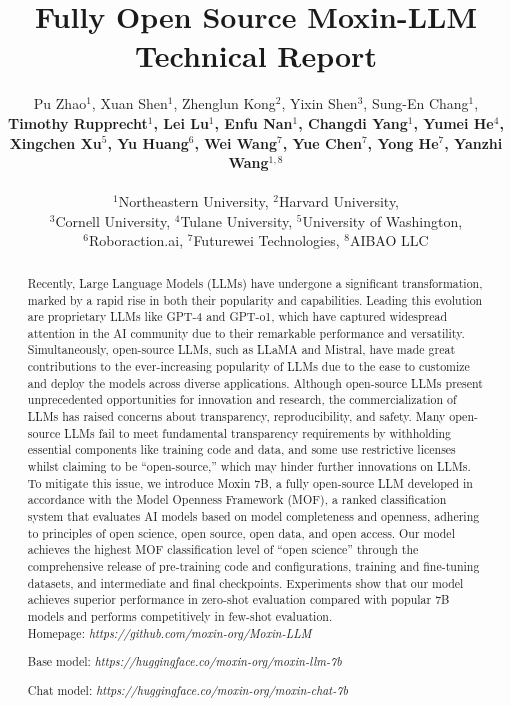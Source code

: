 \documentclass{article}
\title{Fully Open Source Moxin-LLM Technical Report}
\author{Pu Zhao$^1$, Xuan Shen$^1$, Zhenglun Kong$^2$, Yixin Shen$^{3}$, Sung-En Chang$^1$, \\ \textbf{Timothy Rupprecht$^1$,  Lei Lu$^1$, Enfu Nan$^1$, Changdi Yang$^1$, Yumei He$^4$, }\\ \textbf{Xingchen Xu$^5$, Yu Huang$^6$, Wei Wang$^7$, Yue Chen$^7$, Yong He$^7$, Yanzhi Wang$^{1,8}$} \\
\\$^1$Northeastern University, $^2$Harvard University,  \\ $^3$Cornell University,  $^4$Tulane University,
 $^5$University of Washington,  \\ $^6$Roboraction.ai, $^7$Futurewei Technologies, $^8$AIBAO LLC}
\begin{document}
\maketitle

\begin{abstract}
Recently, Large Language Models (LLMs) have undergone a significant transformation, marked by a rapid rise in both their popularity and capabilities. Leading this evolution are proprietary LLMs like GPT-4 and GPT-o1, which have captured widespread attention in the AI community due to their remarkable performance and versatility. Simultaneously, open-source LLMs, such as LLaMA and Mistral, have made great contributions to the ever-increasing popularity of LLMs due to the ease to customize and deploy the models across diverse applications. Although open-source LLMs present unprecedented opportunities for innovation and research, the commercialization of LLMs has raised concerns about transparency, reproducibility, and safety. Many open-source LLMs fail to meet fundamental transparency requirements by withholding essential components like training code and data, and some use restrictive licenses whilst claiming to be ``open-source,'' which may hinder further innovations on LLMs. To mitigate this issue, we introduce Moxin 7B, a fully open-source LLM developed in accordance with the Model Openness Framework (MOF), a ranked classification system that evaluates AI models based on model completeness and openness, adhering to principles of open science, open source, open data, and open access. Our model achieves the highest MOF classification level of ``open science'' through the comprehensive release of pre-training code and configurations, training and fine-tuning datasets, and intermediate and final checkpoints. Experiments show that our model achieves superior performance in zero-shot evaluation compared with popular 7B models and performs competitively in few-shot evaluation. 
\\

Homepage: \textit{https://github.com/moxin-org/Moxin-LLM}

Base model: \textit{https://huggingface.co/moxin-org/moxin-llm-7b}

Chat model: \textit{https://huggingface.co/moxin-org/moxin-chat-7b}
\end{abstract}









\end{document}
